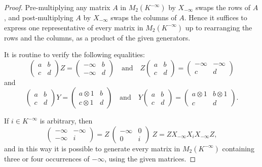 \documentclass{amsart}
\numberwithin{equation}{section}
\theoremstyle{definition}
\begin{document}
\begin{proof}
  Pre-multiplying any matrix $A$ in
  $M_2(K^{-\infty})$ by $X_{-\infty}$ swaps the
  rows of $A$, and post-multiplying $A$ by $X_{-\infty}$ swaps the columns of
  $A$.  Hence it suffices to express one representative of every matrix in 
  $M_2(K^{-\infty})$ up to rearranging the rows and the columns, as a product
  of the given generators. 

  It is routine to verify the following equalities:
  \begin{equation*}\label{eq-annihilate'}
    \begin{pmatrix}
      a & b \\
      c & d
    \end{pmatrix}
    Z 
    = 
    \begin{pmatrix}
      -\infty & b \\
      -\infty & d
    \end{pmatrix}
    \quad
    \text{and}
    \quad
    Z 
    \begin{pmatrix}
      a & b \\
      c & d
    \end{pmatrix}
    = 
    \begin{pmatrix}
      -\infty & -\infty \\
      c       & d 
    \end{pmatrix}
  \end{equation*}
  and 
  \begin{equation*}\label{eq-add-1'}
    \begin{pmatrix}
      a & b \\
      c & d
    \end{pmatrix}
    Y 
    = 
    \begin{pmatrix}
      a \otimes 1 & b \\
      c \otimes 1 & d
    \end{pmatrix}
    \quad
    \text{and}
    \quad
    Y 
    \begin{pmatrix}
      a & b \\
      c & d
    \end{pmatrix}
    = 
    \begin{pmatrix}
      a \otimes 1 & b \otimes 1\\
      c     & d
    \end{pmatrix}.
  \end{equation*}

  If $i\in K^{-\infty}$ is arbitrary, then 
  \begin{equation*}
    \begin{pmatrix}
      -\infty & -\infty \\
      -\infty & i
    \end{pmatrix}
    = 
    Z\ 
    \begin{pmatrix}
      -\infty & 0 \\
      0       & i
    \end{pmatrix}\ 
    Z
    = 
    ZX_{-\infty}X_iX_{-\infty}Z,
  \end{equation*}
  and in this way it is possible to generate every matrix in $M_2(K^{-\infty})$
  containing three or four occurrences of $-\infty$, using the given matrices.


\end{proof}
\end{document}
